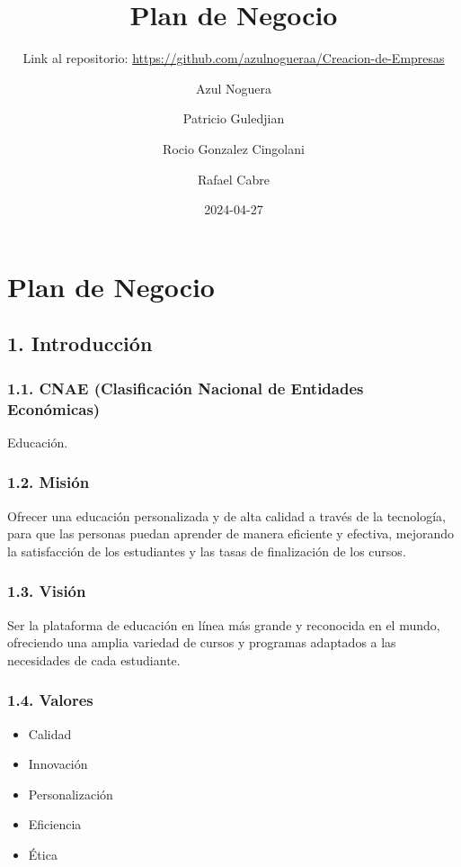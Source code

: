 \documentclass[
]{article}
\title{Plan de Negocio}
\subtitle{Link al repositorio:
\url{https://github.com/azulnogueraa/Creacion-de-Empresas}}
\author{Azul Noguera \and Patricio Guledjian \and Rocio Gonzalez
Cingolani \and Rafael Cabre}
\date{2024-04-27}
\providecommand{\tightlist}{%
  \setlength{\itemsep}{0pt}\setlength{\parskip}{0pt}}
\begin{document}
\maketitle

{
\setcounter{tocdepth}{3}
\tableofcontents
}
\newpage

\section*{Plan de Negocio}

\subsection{1. Introducción}\label{introducciuxf3n}

\subsubsection{1.1. CNAE (Clasificación Nacional de Entidades
Económicas)}\label{cnae-clasificaciuxf3n-nacional-de-entidades-econuxf3micas}

Educación.

\subsubsection{1.2. Misión}\label{misiuxf3n}

Ofrecer una educación personalizada y de alta calidad a través de la
tecnología, para que las personas puedan aprender de manera eficiente y
efectiva, mejorando la satisfacción de los estudiantes y las tasas de
finalización de los cursos.

\subsubsection{1.3. Visión}\label{visiuxf3n}

Ser la plataforma de educación en línea más grande y reconocida en el
mundo, ofreciendo una amplia variedad de cursos y programas adaptados a
las necesidades de cada estudiante.

\subsubsection{1.4. Valores}\label{valores}

\begin{itemize}
\tightlist
\item
  Calidad
\item
  Innovación
\item
  Personalización
\item
  Eficiencia
\item
  Ética
\end{itemize}
\end{document}
